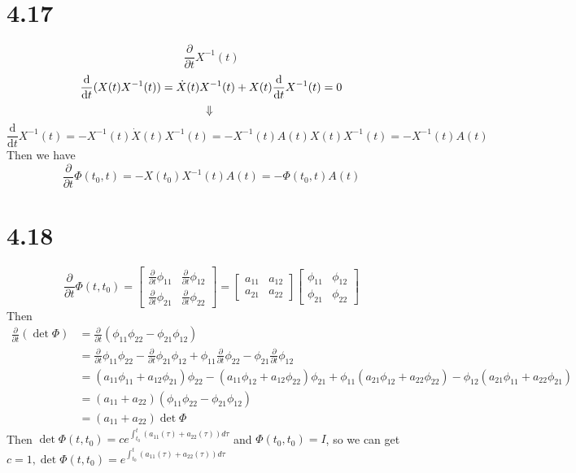 \documentclass{article}
\begin{document}
\section*{4.17}
$$
\frac{\partial }{\partial t}X^{-1}(t)$$
$$
\frac{\mathrm{d} }{\mathrm{d} t}(X(t)X^{-1}(t))=\dot {X}(t)X^{-1}(t)+X(t)\frac{\mathrm{d} }{\mathrm{d} t}X^{-1}(t)=0\\$$
$$\Downarrow\\$$
$$
\frac{\mathrm{d} }{\mathrm{d} t}X^{-1}(t)=-X^{-1}(t)\dot {X}(t)X^{-1}(t)=-X^{-1}(t)A(t) X(t)X^{-1}(t)=-X^{-1}(t)A(t)$$
Then we have
$$\frac{\partial }{\partial t}\Phi(t_{0},t)=-X(t_{0})X^{-1}(t)A(t)=-\Phi(t_{0},t)A(t)$$
\section*{4.18}
$$
\frac{\partial }{\partial t}\Phi(t,t_{0})=
\begin{bmatrix}
\frac{\partial }{\partial t}\phi_{11}&\frac{\partial }{\partial t}\phi_{12}\\
\frac{\partial }{\partial t}\phi_{21}&\frac{\partial }{\partial t}\phi_{22}
\end{bmatrix}=
\begin{bmatrix}
a_{11}&a_{12}\\
a_{21}&a_{22}
\end{bmatrix}
\begin{bmatrix}
\phi_{11}&\phi_{12}\\
\phi_{21}&\phi_{22}
\end{bmatrix}
$$
Then
$$
\begin{aligned}
\frac{\partial}{\partial t}(\operatorname{det} \Phi)&=\frac{\partial}{\partial t}\left(\phi_{11} \phi_{22}-\phi_{21} \phi_{12}\right)\\
&=\frac{\partial}{\partial t}\phi_{11} \phi_{22}-\frac{\partial}{\partial t}\phi_{21} \phi_{12}+\phi_{11} \frac{\partial}{\partial t}\phi_{22}-\phi_{21} \frac{\partial}{\partial t}\phi_{12}\\
&=\left(a_{11} \phi_{11}+a_{12} \phi_{21}\right) \phi_{22}-\left(a_{11} \phi_{12}+a_{12} \phi_{22}\right) \phi_{21}+\phi_{11}\left(a_{21} \phi_{12}+a_{22} \phi_{22}\right)-\phi_{12}\left(a_{21} \phi_{11}+a_{22} \phi_{21}\right)\\
&=\left(a_{11}+a_{22}\right)\left(\phi_{11} \phi_{22}-\phi_{21} \phi_{12}\right)\\
&=\left(a_{11}+a_{22}\right) \operatorname{det} \Phi
\end{aligned}
$$
Then
$\operatorname{det} \Phi\left(t, t_{0}\right)=c e^{\int_{t_{0}}^{t}\left(a_{11}(\tau)+a_{22}(\tau)\right) d \tau}$ and $ \Phi\left(t_{0}, t_{0}\right)=I$, so we can get $c=1 ,\operatorname{det} \Phi\left(t, t_{0}\right)= e^{\int_{t_{0}}^{t}\left(a_{11}(\tau)+a_{22}(\tau)\right) d \tau}$
\end{document}
